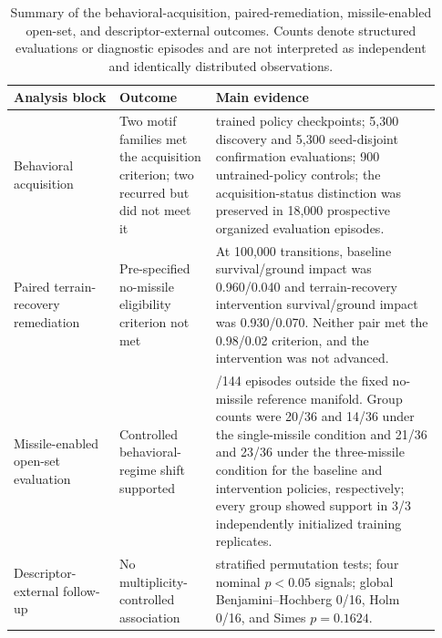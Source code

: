 \begin{table}[!htbp]
\centering
\small
\setlength{\tabcolsep}{4pt}
\renewcommand{\arraystretch}{1.08}
\caption{Summary of the behavioral-acquisition, paired-remediation,
missile-enabled open-set, and descriptor-external outcomes. Counts denote
structured evaluations or diagnostic episodes and are not interpreted as
independent and identically distributed observations.}
\label{tab:behavioral-summary}
\begin{tabular}{@{}
>{\raggedright\arraybackslash}p{0.23\linewidth}
>{\raggedright\arraybackslash}p{0.21\linewidth}
>{\raggedright\arraybackslash}p{0.49\linewidth}
@{}}
\toprule
Analysis block & Outcome & Main evidence \\
\midrule
Behavioral acquisition &
Two motif families met the acquisition criterion; two recurred but did not meet it &
53 trained policy checkpoints; 5,300 discovery and 5,300 seed-disjoint
confirmation evaluations; 900 untrained-policy controls; the
acquisition-status distinction was preserved in 18,000 prospective organized
evaluation episodes. \\
\addlinespace
Paired terrain-recovery remediation &
Pre-specified no-missile eligibility criterion not met &
At 100,000 transitions, baseline survival/ground impact was 0.960/0.040 and
terrain-recovery intervention survival/ground impact was 0.930/0.070. Neither
pair met the 0.98/0.02 criterion, and the intervention was not advanced. \\
\addlinespace
Missile-enabled open-set evaluation &
Controlled behavioral-regime shift supported &
78/144 episodes outside the fixed no-missile reference manifold. Group counts
were 20/36 and 14/36 under the single-missile condition and 21/36 and 23/36
under the three-missile condition for the baseline and intervention policies,
respectively; every group showed support in 3/3 independently initialized
training replicates. \\
\addlinespace
Descriptor-external follow-up &
No multiplicity-controlled association &
16 stratified permutation tests; four nominal $p<0.05$ signals; global
Benjamini--Hochberg 0/16, Holm 0/16, and Simes $p=0.1624$. \\
\bottomrule
\end{tabular}
\end{table}
